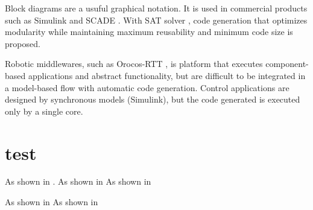 \documentclass[conference,compsoc]{IEEEtran}
\begin{document}
 Block diagrams are a usuful graphical notation. 
It is used in commercial products such as Simulink and SCADE \cite{Lublinerman:2009:MCG:1480881.1480893}.
With SAT solver \cite{Lublinerman:2009:MCG:1480881.1480893}, code generation that optimizes modularity while maintaining maximum reusability and minimum code size is proposed.

 Robotic middlewares, such as Orocos-RTT \cite{}, is platform that executes component-based applications and abstract functionality, but are difficult to be integrated in a model-based flow with automatic code generation.
 Control applications are designed by synchronous models (Simulink), but the code generated is executed only by a single core.



\section{test}

As shown in \cite{Deng:2015:MSF:2735960.2735972}.
As shown in \cite{6871195}
As shown in \cite{4550788}

As shown in \cite{Lublinerman:2009:MCG:1480881.1480893}
As shown in \cite{Ptolemaeus:14:SystemDesign}


\end{document}
